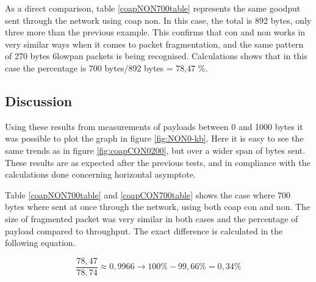\noindent As a direct comparison, table \ref{coapNON700table} represents the same \gls{goodput} sent through the network using \gls{coap} \gls{non}. In this case, the total is 892 bytes, only three more than the previous example. This confirms that \gls{con} and \gls{non} works in very similar ways when it comes to packet fragmentation, and the same pattern of 270 bytes \gls{6lowpan} packets is being recognised. Calculations shows that in this case the percentage is 700 bytes/892 bytes = 78,47 \%. 



\subsection{Discussion}

\noindent Using these results from measurements of \glspl{payload} between 0 and 1000 bytes it was possible to plot the graph in figure \ref{fig:NON0-kb}. Here it is easy to see the same trends as in figure \ref{fig:coapCON0200}, but over a wider span of bytes sent. These results are as expected after the previous tests, and in compliance with the calculations done concerning horizontal asymptote.  


\noindent Table \ref{coapNON700table} and \ref{coapCON700table} shows the case where 700 bytes where sent at once through the network, using both \gls{coap} \gls{con} and \gls{non}. The size of fragmented packet was very similar in both cases and the percentage of \gls{payload} compared to \gls{throughput}. The exact difference is calculated in the following equation. 

\begin{equation} \label{lessThanHAlfAPercentCalculation}
    \frac{78,47}{78,74} \approx 0,9966  \rightarrow 100 \% - 99,66 \% = 0,34 \%
\end{equation}


